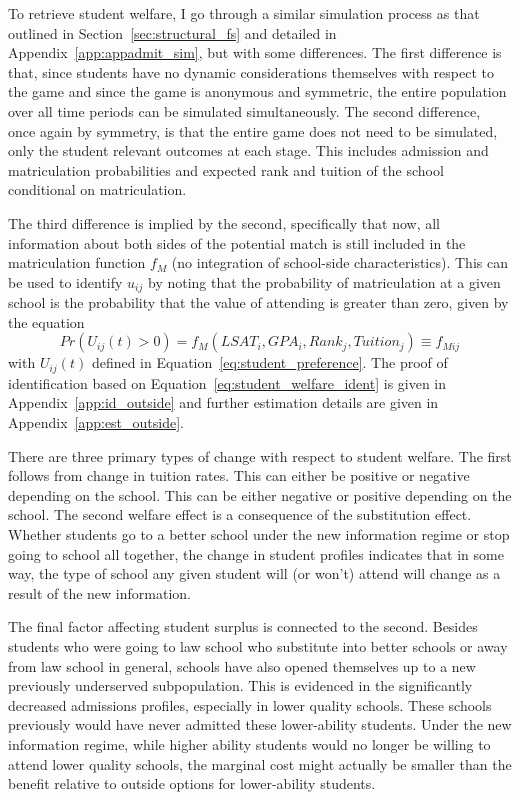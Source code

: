 \documentclass[12pt]{article}
\theoremstyle{definition}
\begin{document}
To retrieve student welfare, I go through a similar simulation process as that outlined in Section~\ref{sec:structural_fs} and detailed in Appendix~\ref{app:appadmit_sim}, but with some differences. The first difference is that, since students have no dynamic considerations themselves with respect to the game and since the game is anonymous and symmetric, the entire population over all time periods can be simulated simultaneously. The second difference, once again by symmetry, is that the entire game does not need to be simulated, only the student relevant outcomes at each stage. This includes admission and matriculation probabilities and expected rank and tuition of the school conditional on matriculation.

The third difference is implied by the second, specifically that now, all information about both sides of the potential match is still included in the matriculation function $f_M$ (no integration of school-side characteristics). This can be used to identify $u_{ij}$ by noting that the probability of matriculation at a given school is the probability that the value of attending is greater than zero, given by the equation
\begin{equation}
  Pr(U_{ij}(t) > 0) = f_M(LSAT_i, GPA_i, Rank_j, Tuition_j) \equiv f_{Mij}
  \label{eq:student_welfare_ident}
\end{equation}
with $U_{ij}(t)$ defined in Equation~\eqref{eq:student_preference}. The proof of identification based on Equation~\eqref{eq:student_welfare_ident} is given in Appendix~\ref{app:id_outside} and further estimation details are given in Appendix~\ref{app:est_outside}.

There are three primary types of change with respect to student welfare. The first follows from change in tuition rates. This can either be positive or negative depending on the school. This can be either negative or positive depending on the school. The second welfare effect is a consequence of the substitution effect. Whether students go to a better school under the new information regime or stop going to school all together, the change in student profiles indicates that in some way, the type of school any given student will (or won't) attend will change as a result of the new information.

The final factor affecting student surplus is connected to the second. Besides students who were going to law school who substitute into better schools or away from law school in general, schools have also opened themselves up to a new previously underserved subpopulation. This is evidenced in the significantly decreased admissions profiles, especially in lower quality schools. These schools previously would have never admitted these lower-ability students. Under the new information regime, while higher ability students would no longer be willing to attend lower quality schools, the marginal cost might actually be smaller than the benefit relative to outside options for lower-ability students.
\end{document}
